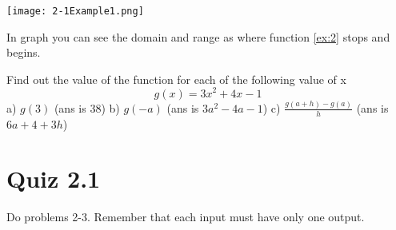 \documentclass{tufte-handout}
\begin{document}
\begin{marginfigure}
  \texttt{[image: 2-1Example1.png]}
  \caption{In graph you can see the domain and range as where function \ref{ex:2} stops and begins.}
  \label{fig:ex1}
\end{marginfigure}

Find out the value of the function for each of the following value of x
\begin{equation}
g(x) = 3x^2+4x-1
\end{equation}
a) $g(3)$ (ans is 38) b) $g(-a)$ (ans is $3a^2-4a-1$) c) $\frac{g(a+h) - g(a)}{h}$ (ans is $6a+4+3h$)

\section{Quiz 2.1}
Do problems 2-3. Remember that each input must have only one output.
\end{document}
